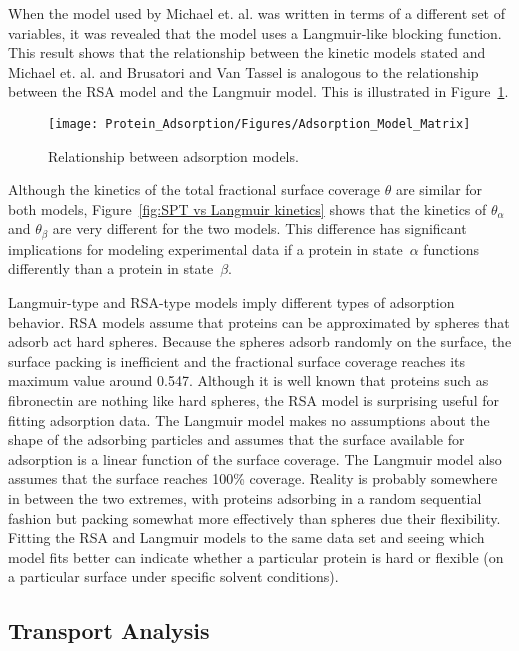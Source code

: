 When the model used by Michael et. al. \cite{Michael2003} was written
in terms of a different set of variables, it was revealed that the
model uses a Langmuir-like blocking function. This result shows that
the relationship between the kinetic models stated and Michael et.
al. and Brusatori and Van Tassel is analogous to the relationship
between the RSA model and the Langmuir model. This is illustrated
in Figure~\ref{fig:Adsorption Model Matrix}.%
\begin{figure}
\texttt{[image: Protein\_Adsorption/Figures/Adsorption\_Model\_Matrix]}

\caption{\label{fig:Adsorption Model Matrix}Relationship between adsorption
models.}


%
\end{figure}
 Although the kinetics of the total fractional surface coverage $\theta$
are similar for both models, Figure~\ref{fig:SPT vs Langmuir kinetics}
shows that the kinetics of $\theta_{\alpha}$ and $\theta_{\beta}$
are very different for the two models. This difference has significant
implications for modeling experimental data if a protein in state~$\alpha$
functions differently than a protein in state~$\beta$.

Langmuir-type and RSA-type models imply different types of adsorption
behavior. RSA models assume that proteins can be approximated by spheres
that adsorb act hard spheres. Because the spheres adsorb randomly
on the surface, the surface packing is inefficient and the fractional
surface coverage reaches its maximum value around 0.547. Although
it is well known that proteins such as fibronectin are nothing like
hard spheres, the RSA model is surprising useful for fitting adsorption
data. The Langmuir model makes no assumptions about the shape of the
adsorbing particles and assumes that the surface available for adsorption
is a linear function of the surface coverage. The Langmuir model also
assumes that the surface reaches 100\% coverage. Reality is probably
somewhere in between the two extremes, with proteins adsorbing in
a random sequential fashion but packing somewhat more effectively
than spheres due their flexibility. Fitting the RSA and Langmuir models
to the same data set and seeing which model fits better can indicate
whether a particular protein is hard or flexible (on a particular
surface under specific solvent conditions).


\subsection{Transport Analysis}

